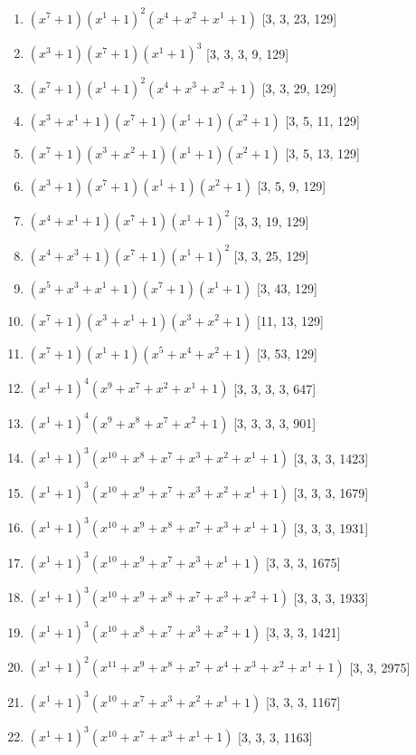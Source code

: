 \documentclass[10pt,twocolumn]{article}
\begin{document}
\begin{enumerate}
\item $(x^{7} + 1)(x^{1} + 1)^{2}(x^{4} + x^{2} + x^{1} + 1)$  [3, 3, 23, 129]
\item $(x^{3} + 1)(x^{7} + 1)(x^{1} + 1)^{3}$  [3, 3, 3, 9, 129]
\item $(x^{7} + 1)(x^{1} + 1)^{2}(x^{4} + x^{3} + x^{2} + 1)$  [3, 3, 29, 129]
\item $(x^{3} + x^{1} + 1)(x^{7} + 1)(x^{1} + 1)(x^{2} + 1)$  [3, 5, 11, 129]
\item $(x^{7} + 1)(x^{3} + x^{2} + 1)(x^{1} + 1)(x^{2} + 1)$  [3, 5, 13, 129]
\item $(x^{3} + 1)(x^{7} + 1)(x^{1} + 1)(x^{2} + 1)$  [3, 5, 9, 129]
\item $(x^{4} + x^{1} + 1)(x^{7} + 1)(x^{1} + 1)^{2}$  [3, 3, 19, 129]
\item $(x^{4} + x^{3} + 1)(x^{7} + 1)(x^{1} + 1)^{2}$  [3, 3, 25, 129]
\item $(x^{5} + x^{3} + x^{1} + 1)(x^{7} + 1)(x^{1} + 1)$  [3, 43, 129]
\item $(x^{7} + 1)(x^{3} + x^{1} + 1)(x^{3} + x^{2} + 1)$  [11, 13, 129]
\item $(x^{7} + 1)(x^{1} + 1)(x^{5} + x^{4} + x^{2} + 1)$  [3, 53, 129]
\item $(x^{1} + 1)^{4}(x^{9} + x^{7} + x^{2} + x^{1} + 1)$  [3, 3, 3, 3, 647]
\item $(x^{1} + 1)^{4}(x^{9} + x^{8} + x^{7} + x^{2} + 1)$  [3, 3, 3, 3, 901]
\item $(x^{1} + 1)^{3}(x^{10} + x^{8} + x^{7} + x^{3} + x^{2} + x^{1} + 1)$  [3, 3, 3, 1423]
\item $(x^{1} + 1)^{3}(x^{10} + x^{9} + x^{7} + x^{3} + x^{2} + x^{1} + 1)$  [3, 3, 3, 1679]
\item $(x^{1} + 1)^{3}(x^{10} + x^{9} + x^{8} + x^{7} + x^{3} + x^{1} + 1)$  [3, 3, 3, 1931]
\item $(x^{1} + 1)^{3}(x^{10} + x^{9} + x^{7} + x^{3} + x^{1} + 1)$  [3, 3, 3, 1675]
\item $(x^{1} + 1)^{3}(x^{10} + x^{9} + x^{8} + x^{7} + x^{3} + x^{2} + 1)$  [3, 3, 3, 1933]
\item $(x^{1} + 1)^{3}(x^{10} + x^{8} + x^{7} + x^{3} + x^{2} + 1)$  [3, 3, 3, 1421]
\item $(x^{1} + 1)^{2}(x^{11} + x^{9} + x^{8} + x^{7} + x^{4} + x^{3} + x^{2} + x^{1} + 1)$  [3, 3, 2975]
\item $(x^{1} + 1)^{3}(x^{10} + x^{7} + x^{3} + x^{2} + x^{1} + 1)$  [3, 3, 3, 1167]
\item $(x^{1} + 1)^{3}(x^{10} + x^{7} + x^{3} + x^{1} + 1)$  [3, 3, 3, 1163]

\end{enumerate}
\end{document}
